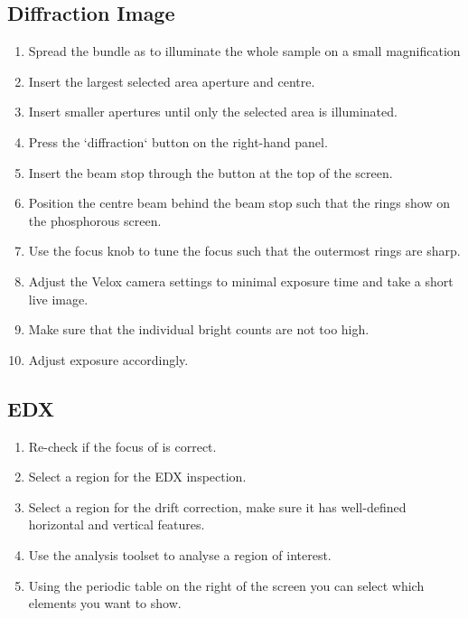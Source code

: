 \documentclass[a4paper]{scrartcl}
\begin{document}
\subsection*{Diffraction Image}
\begin{enumerate}
	\item Spread the bundle as to illuminate the whole sample on a small magnification
	\item Insert the largest selected area aperture and centre.
	\item Insert smaller apertures until only the selected area is illuminated.
	\item Press the `diffraction` button on the right-hand panel.
	\item Insert the beam stop through the button at the top of the screen.
	\item Position the centre beam behind the beam stop such that the rings show on the phosphorous screen.
	\item Use the focus knob to tune the focus such that the outermost rings are sharp.
	\item Adjust the Velox camera settings to minimal exposure time and take a short live image.
	\item Make sure that the individual bright counts are not too high.
	\item Adjust exposure accordingly.
\end{enumerate}

\subsection*{EDX}
\begin{enumerate}
	\item Re-check if the focus of is correct.
	\item Select a region for the EDX inspection.
	\item Select a region for the drift correction, make sure it has well-defined horizontal and vertical features.
	\item Use the analysis toolset to analyse a region of interest.
	\item Using the periodic table on the right of the screen you can select which elements you want to show.
\end{enumerate}
\end{document}
